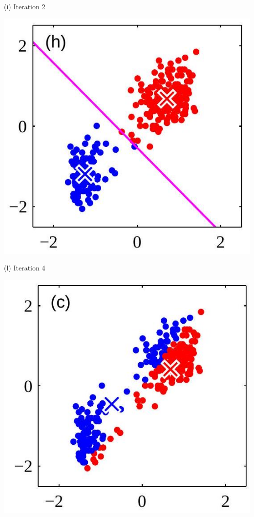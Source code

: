 \documentclass[10pt]{article}
\begin{document}
(i) Iteration 2

\begin{center}
\includegraphics[max width=\textwidth]{2023_12_30_43b7e6c218cb987b5fcag-6(5)}
\end{center}

(l) Iteration 4

\begin{center}
\includegraphics[max width=\textwidth]{2023_12_30_43b7e6c218cb987b5fcag-6(3)}
\end{center}
\end{document}
